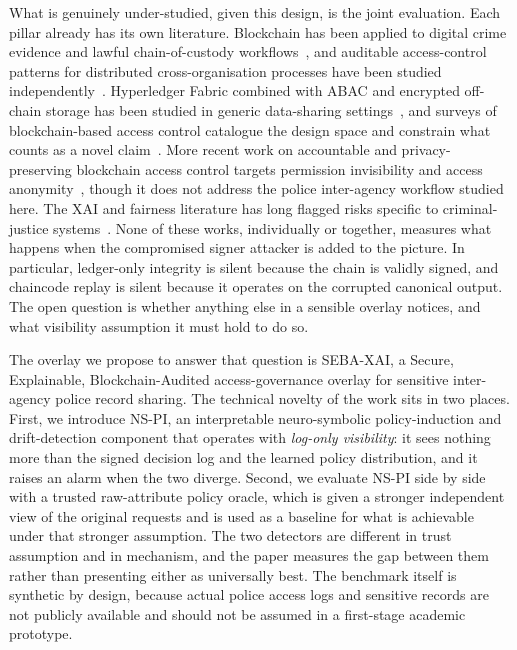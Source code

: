 What is genuinely under-studied, given this design, is the joint
evaluation. Each pillar already has its own literature. Blockchain has
been applied to digital crime evidence and lawful chain-of-custody
workflows~\cite{kim_two_level_2021,li_lechain_2021,jeong_fabric_evidence_2020},
and auditable access-control patterns for distributed cross-organisation
processes have been studied
independently~\cite{akhtar_auditable_access_2020}. Hyperledger Fabric
combined with ABAC and encrypted off-chain storage has been studied in
generic data-sharing settings~\cite{zhao_fabric_abac_2022}, and surveys of
blockchain-based access control catalogue the design space and constrain
what counts as a novel
claim~\cite{rouhani_access_control_survey_2019,nist_blockchain_access_2022}.
More recent work on accountable and privacy-preserving blockchain access
control targets permission invisibility and access
anonymity~\cite{hu_accountable_private_ac_2024}, though it does not address
the police inter-agency workflow studied here. The XAI and fairness
literature has long flagged risks specific to criminal-justice
systems~\cite{rudin_2019,ensign_feedback_2018,zocholl_xai_law_enforcement_2025}.
None of these works, individually or together, measures what happens when
the compromised signer attacker is added to the picture. In particular,
ledger-only integrity is silent because the chain is validly signed, and
chaincode replay is silent because it operates on the corrupted canonical
output. The open question is whether anything else in a sensible overlay
notices, and what visibility assumption it must hold to do so.

The overlay we propose to answer that question is SEBA-XAI, a Secure,
Explainable, Blockchain-Audited access-governance overlay for sensitive
inter-agency police record sharing. The technical novelty of the work sits
in two places. First, we introduce NS-PI, an interpretable neuro-symbolic
policy-induction and drift-detection component that operates with
\emph{log-only visibility}: it sees nothing more than the signed decision
log and the learned policy distribution, and it raises an alarm when the
two diverge. Second, we evaluate NS-PI side by side with a trusted
raw-attribute policy oracle, which is given a stronger independent view of
the original requests and is used as a baseline for what is achievable
under that stronger assumption. The two detectors are different in trust
assumption and in mechanism, and the paper measures the gap between them
rather than presenting either as universally best. The benchmark itself is
synthetic by design, because actual police access logs and sensitive
records are not publicly available and should not be assumed in a
first-stage academic prototype.

